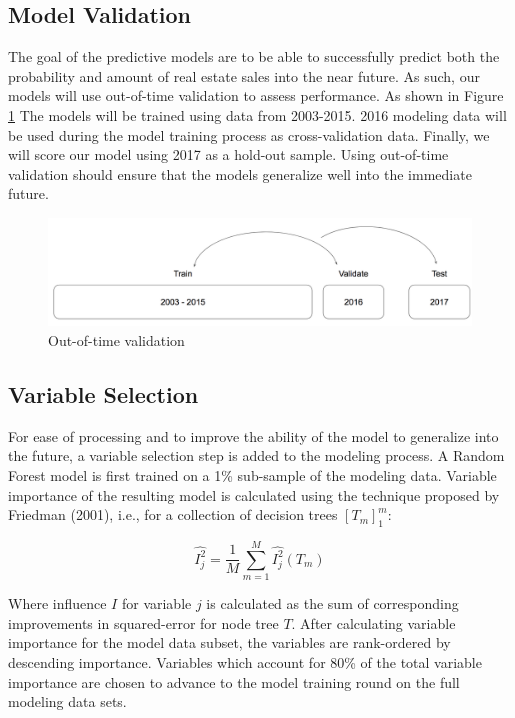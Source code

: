 \documentclass[12pt,]{article}
\begin{document}
\hypertarget{model-validation}{%
\subsection{Model Validation}\label{model-validation}}

The goal of the predictive models are to be able to successfully predict
both the probability and amount of real estate sales into the near
future. As such, our models will use out-of-time validation to assess
performance. As shown in Figure \ref{fig:Train Test Validate} The models
will be trained using data from 2003-2015. 2016 modeling data will be
used during the model training process as cross-validation data.
Finally, we will score our model using 2017 as a hold-out sample. Using
out-of-time validation should ensure that the models generalize well
into the immediate future.

\begin{figure}[H]
\includegraphics[width=1\linewidth]{Sections/tables and figures/Train Validate Test} \caption{Out-of-time validation}\label{fig:Train Test Validate}
\end{figure}

\hypertarget{variable-selection}{%
\subsection{Variable Selection}\label{variable-selection}}

For ease of processing and to improve the ability of the model to
generalize into the future, a variable selection step is added to the
modeling process. A Random Forest model is first trained on a 1\%
sub-sample of the modeling data. Variable importance of the resulting
model is calculated using the technique proposed by Friedman (2001),
i.e., for a collection of decision trees \([T_m]_{1}^{m}\):

\[
  \hat{I_{j}^{2}} = \frac{1}{M} \sum_{m=1}^{M}\hat{I_{j}^{2}}(T_m)
\]

Where influence \(I\) for variable \(j\) is calculated as the sum of
corresponding improvements in squared-error for node tree \(T\). After
calculating variable importance for the model data subset, the variables
are rank-ordered by descending importance. Variables which account for
80\% of the total variable importance are chosen to advance to the model
training round on the full modeling data sets.
\end{document}
